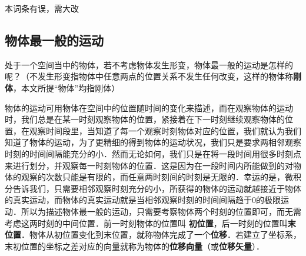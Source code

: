 
\begin{issues}
本词条有误，需大改
\end{issues}
\subsection{物体最一般的运动}
处于一个空间当中的物体，若不考虑物体发生形变，物体最一般的运动是怎样的呢？（不发生形变指物体中任意两点的位置关系不发生任何改变，这样的物体称\textbf{刚体}，本文所提“物体”均指刚体）

物体的运动可用物体在空间中的位置随时间的变化来描述，而在观察物体的运动时，我们总是在某一时刻观察物体的位置，紧接着在下一时刻继续观察物体的位置，在观察时间段里，当知道了每一个观察时刻物体对应的位置，我们就认为我们知道了物体的运动，为了更精细的得到物体的运动状况，我们只是要求两相邻观察时刻的时间间隔能充分的小．然而无论如何，我们只是在将一段时间用很多时刻点来进行划分，并观察每一时刻物体的位置．这是因为在一段时间内所能做到的对物体的观察的次数只能是有限的，而任意两时刻间的时刻是无限的．幸运的是，微积分告诉我们，只需要相邻观察时刻充分的小，所获得的物体的运动就越接近于物体的真实运动，而物体的真实运动就是当相邻观察时刻的时间间隔趋于0的极限运动．所以为描述物体最一般的运动，只需要考察物体两个时刻的位置即可，而无需考虑这两时刻的中间位置．前一时刻物体的位置叫 \textbf{初位置}，后一时刻的位置叫\textbf{末位置}．物体从初位置变化到末位置，就称物体完成了一个\textbf{位移}．若建立了坐标系，末初位置的坐标之差对应的向量就称为物体的\textbf{位移向量}（或\textbf{位移矢量}）．
